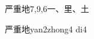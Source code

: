 \begin{entry}{严重地}{7,9,6}{⼀、⾥、⼟}
  \begin{phonetics}{严重地}{yan2zhong4 di4}
  \end{phonetics}
\end{entry}
